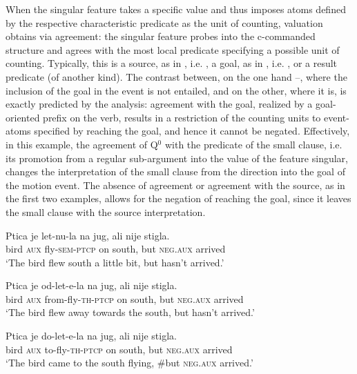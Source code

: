 \documentclass[output=paper]{langscibook}
\begin{document}
When the singular feature takes a specific value and thus imposes atoms defined by the respective characteristic predicate as the unit of counting, valuation obtains via agreement: the singular feature probes into the c-commanded structure and agrees with the most local predicate specifying a possible unit of counting. Typically, this is a source, as in , i.e. , a goal, as in , i.e. , or a result predicate (of another kind). The contrast between, on the one hand --, where the inclusion of the goal in the event is not entailed, and  on the other, where it is, is exactly predicted by the analysis: agreement with the goal, realized by a goal-oriented prefix on the verb, results in a restriction of  the counting units to event-atoms specified by reaching the goal, and hence it cannot be negated. Effectively, in this example, the agreement of Q$^0$ with the predicate of the small clause, i.e. its promotion from a regular sub-argument into the value of the feature singular, changes the interpretation of the small clause from the direction into the goal of the motion event. The absence of agreement or agreement with the source, as in the first two examples, allows for the negation of reaching the goal, since it leaves the small clause with the source interpretation.\largerpage

\ea\label{ars:ex:QP}
		\begin{xlist}
	
	    \ex  \gll Ptica je let-nu-la na jug, ali nije stigla.\\ 
        bird \textsc{aux} fly-\textsc{sem-ptcp} on south, but \textsc{neg.aux} arrived\\
        \glt `The bird flew south a little bit, but hasn't arrived.'\\ \label{ars:ex:QPa}

	    \ex  \gll Ptica je od-let-e-la na jug, ali nije stigla.\\ 
        bird \textsc{aux} from-fly-\textsc{th-ptcp} on south, but \textsc{neg.aux} arrived\\
        \glt `The bird flew away towards the south, but hasn't arrived.'\\ \label{ars:ex:QPb}
        
	    \ex  \gll Ptica je do-let-e-la na jug, \minsp{\#} ali nije stigla.\\ 
        bird \textsc{aux} to-fly-\textsc{th-ptcp} on south, {} but \textsc{neg.aux} arrived\\
        \glt `The bird came to the south flying, $\#$but \textsc{neg.aux} arrived.'\\ \label{ars:ex:QPc}

	    \end{xlist}
\z
\end{document}

